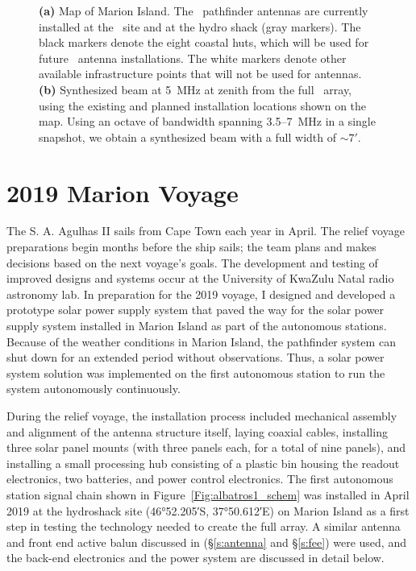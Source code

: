 \begin{figure}
\begin{subfigure}[t]{0.39\textwidth}
		\caption{} \label{Fig:marion_beam}
	\end{subfigure}
	\caption{{\bf (a)} Map of Marion Island.  The
		\albatros\ pathfinder antennas are currently installed at the
		\prizm\ site and at the hydro shack (gray markers).  The black
		markers denote the eight coastal huts, which will be used for
		future \albatros\ antenna installations.  The white markers
		denote other available infrastructure points that will not be
		used for antennas. {\bf (b)} Synthesized beam at 5~MHz at zenith from the full \albatros\ array, using the existing and planned
		installation locations shown on the map.  Using an octave of
		bandwidth spanning 3.5--7~MHz in a single snapshot, we obtain a synthesized beam with a full width of $\sim7'$.}\label{Fig:marion_map_beam}
\end{figure}

\section{2019 Marion Voyage}

The S. A. Agulhas II sails from Cape Town each year in April. The relief voyage preparations begin months before the ship sails; the team plans and makes decisions based on the next voyage's goals. The development and testing of improved designs and systems occur at the University of KwaZulu Natal radio astronomy lab. In preparation for the 2019 voyage, I designed and developed a prototype solar power supply system that paved the way for the solar power supply system installed in Marion Island as part of the autonomous stations. Because of the weather conditions in Marion Island, the pathfinder system can shut down for an extended period without observations. Thus, a solar power system solution was implemented on the first autonomous station to run the system autonomously continuously. 

During the relief voyage, the installation process included mechanical assembly and alignment of the antenna structure itself, laying coaxial cables, installing three solar panel mounts (with three panels each, for a total of nine panels), and installing a small processing hub consisting of a plastic bin housing the readout electronics, two batteries, and power control electronics. The first autonomous station signal chain shown in Figure~\ref{Fig:albatros1_schem} was installed in April 2019 at the hydroshack site (\ang{46;52.205;}S, \ang{37;50.612;}E) on Marion Island as a first step in testing the technology needed to create the full array. A similar antenna and front end active balun discussed in (\S\ref{s:antenna} and \S\ref{s:fee}) were used, and the back-end electronics and the power system are discussed in detail below.

